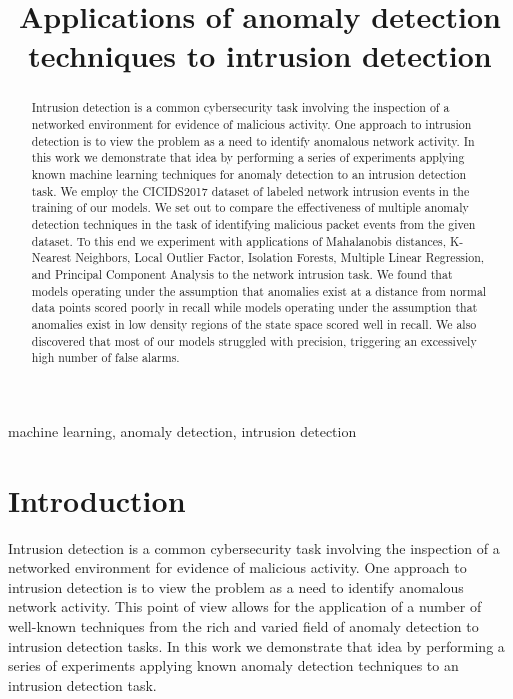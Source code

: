 \documentclass[conference]{IEEEtran}
\begin{document}
\title{Applications of anomaly detection techniques to intrusion detection}

\author{
}

\maketitle

\begin{abstract}
Intrusion detection is a common cybersecurity task involving the inspection of a networked environment for evidence of malicious activity. One approach to intrusion detection is to view the problem as a need to identify anomalous network activity. In this work we demonstrate that idea by performing a series of experiments applying known machine learning techniques for anomaly detection to an intrusion detection task. We employ the CICIDS2017 dataset of labeled network intrusion events in the training of our models. We set out to compare the effectiveness of multiple anomaly detection techniques in the task of identifying malicious packet events from the given dataset. To this end we experiment with applications of Mahalanobis distances, K-Nearest Neighbors, Local Outlier Factor, Isolation Forests, Multiple Linear Regression, and Principal Component Analysis to the network intrusion task. We found that models operating under the assumption that anomalies exist at a distance from normal data points scored poorly in recall while models operating under the assumption that anomalies exist in low density regions of the state space scored well in recall. We also discovered that most of our models struggled with precision, triggering an excessively high number of false alarms.
\end{abstract}

\begin{IEEEkeywords}
machine learning, anomaly detection, intrusion detection
\end{IEEEkeywords}

\section{Introduction}

Intrusion detection is a common cybersecurity task involving the inspection of a networked environment for evidence of malicious activity. One approach to intrusion detection is to view the problem as a need to identify anomalous network activity. This point of view allows for the application of a number of well-known techniques from the rich and varied field of anomaly detection to intrusion detection tasks. In this work we demonstrate that idea by performing a series of experiments applying known anomaly detection techniques to an intrusion detection task.
\end{document}
